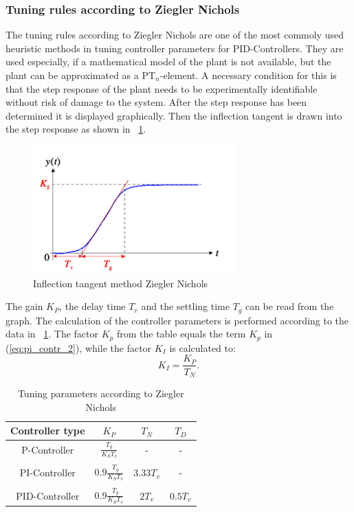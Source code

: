 \subsubsection{Tuning rules according to Ziegler Nichols}
The tuning rules according to Ziegler Nichols are one of the most commoly used heuristic methods in tuning controller parameters for PID-Controllers. They are used especially, if a mathematical model of the plant is not available, but the plant can be approximated as a PT$_{n}$-element.\cite{Reg_17}
A necessary condition for this is that the step response of the plant needs to be experimentally identifiable without risk of damage to the system. After the step response has been determined it is displayed graphically. Then the inflection tangent is drawn into the step response as shown in \figurename~\ref{fig:param_zn}.
\begin{figure}
   \centering
   \includegraphics[width=0.7\textwidth]{images/param_zn.jpg}
   \caption[Inflection tangent method Ziegler Nichols]{Inflection tangent method Ziegler Nichols}
   \label{fig:param_zn}
 \end{figure}
The gain $K_{P}$, the delay time $T_{v}$ and the settling time $T_{g}$ can be read from the graph.
The calculation of the controller parameters is performed according to the data in \tablename~\ref{tab:param_zn}. The factor $K_{p}$ from the table equals the term $K_{p}$ in (\ref{eq:pi_contr_2}), while the factor $K_{I}$ is calculated to:
\begin{equation}
    K_{I}  = \frac{K_{P}}{T_{N}}.
 \label{eq:K_I}
\end{equation}
\begin{table}
  \centering
  \begin{tabularx}{0.6\textwidth}{c|c|c|c}
    \toprule
    Controller type & $K_{P}$ &  $T_{N}$ & $T_{D}$   \\
    \midrule
    P-Controller &  $\frac{T_{g}}{K_{S}T_{v}}$ & - & - \\
    & & & \\
    PI-Controller & $0.9\frac{T_{g}}{K_{S}T_{v}}$ & $3.33T_{v}$ & - \\
    & & & \\
    PID-Controller & $0.9\frac{T_{g}}{K_{S}T_{v}}$ & $2T_{v}$ & $0.5T_{v}$ \\
     \bottomrule
  \end{tabularx}
  \caption[Tuning parameters Ziegler Nichols]{Tuning parameters according to Ziegler Nichols}
  \label{tab:param_zn}
\end{table}

